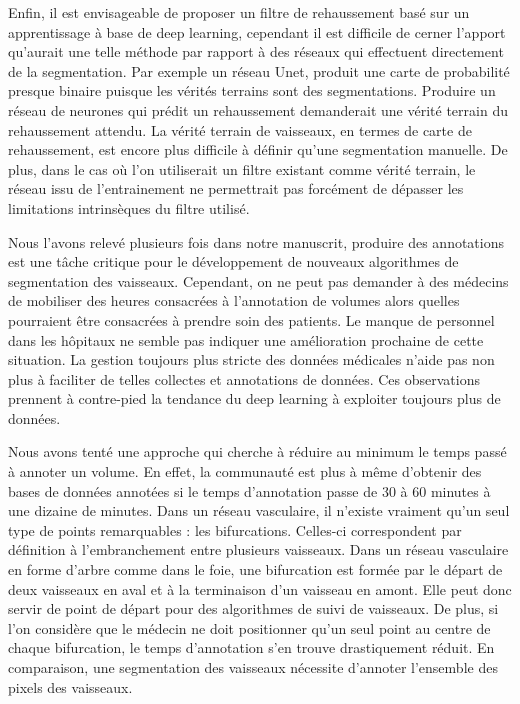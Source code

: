 Enfin, il est envisageable de proposer un filtre de rehaussement basé sur un apprentissage à base de deep learning, cependant il est difficile de cerner l'apport qu'aurait une telle méthode par rapport à des réseaux qui effectuent directement de la segmentation. Par exemple un réseau Unet, produit une carte de probabilité presque binaire puisque les vérités terrains sont des segmentations. Produire un réseau de neurones qui prédit un rehaussement demanderait une vérité terrain du rehaussement attendu. La vérité terrain de vaisseaux, en termes de carte de rehaussement, est encore plus difficile à définir qu'une segmentation manuelle. De plus, dans le cas où l'on utiliserait un filtre existant comme vérité terrain, le réseau issu de l'entrainement ne permettrait pas forcément de dépasser les limitations intrinsèques du filtre utilisé.

Nous l'avons relevé plusieurs fois dans notre manuscrit, produire des annotations est une tâche critique pour le développement de nouveaux algorithmes de segmentation des vaisseaux. Cependant, on ne peut pas demander à des médecins de mobiliser des heures consacrées à l'annotation de volumes alors quelles pourraient être consacrées à prendre soin des patients. Le manque de personnel dans les hôpitaux ne semble pas indiquer une amélioration prochaine de cette situation. La gestion toujours plus stricte des données médicales n'aide pas non plus à faciliter de telles collectes et annotations de données. Ces observations prennent à contre-pied la tendance du deep learning à exploiter toujours plus de données.

Nous avons tenté une approche qui cherche à réduire au minimum le temps passé à annoter un volume. En effet, la communauté est plus à même d'obtenir des bases de données annotées si le temps d'annotation passe de 30 à 60 minutes à une dizaine de minutes. Dans un réseau vasculaire, il n'existe vraiment qu'un seul type de points remarquables : les bifurcations. Celles-ci correspondent par définition à l'embranchement entre plusieurs vaisseaux. Dans un réseau vasculaire en forme d'arbre comme dans le foie, une bifurcation est formée par le départ de deux vaisseaux en aval et à la terminaison d'un vaisseau en amont. Elle peut donc servir de point de départ pour des algorithmes de suivi de vaisseaux. De plus, si l'on considère que le médecin ne doit positionner qu'un seul point au centre de chaque bifurcation, le temps d'annotation s'en trouve drastiquement réduit. En comparaison, une segmentation des vaisseaux nécessite d'annoter l'ensemble des pixels des vaisseaux.
 

